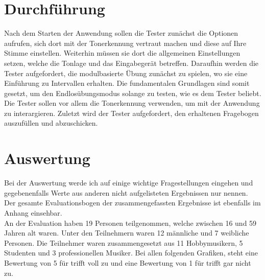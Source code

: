 \section{Durchführung}
Nach dem Starten der Anwendung sollen die Tester zunächst die Optionen aufrufen, sich dort mit der Tonerkennung vertraut machen und diese auf Ihre Stimme einstellen. Weiterhin müssen sie dort die allgemeinen Einstellungen setzen, welche die Tonlage und das Eingabegerät betreffen. Daraufhin werden die Tester aufgefordert, die modulbasierte Übung zunächst zu spielen, wo sie eine Einführung zu Intervallen erhalten. Die fundamentalen Grundlagen sind somit gesetzt, um den Endlosübungsmodus solange zu testen, wie es dem Tester beliebt. Die Tester sollen vor allem die Tonerkennung verwenden, um mit der Anwendung zu interargieren. Zuletzt wird der Tester aufgefordert, den erhaltenen Fragebogen auszufüllen und abzuschicken. 

\newpage
\section{Auswertung}
Bei der Auswertung werde ich auf einige wichtige Fragestellungen eingehen und gegebenenfalls Werte aus anderen nicht aufgelisteten Ergebnissen nur nennen. Der gesamte Evaluationsbogen der zusammengefassten Ergebnisse ist ebenfalls im Anhang einsehbar. \\
An der Evaluation haben 19 Personen teilgenommen, welche zwischen 16 und 59 Jahren alt waren. Unter den Teilnehmern waren 12 männliche und 7 weibliche Personen. Die Teilnehmer waren zusammengesetzt aus 11 Hobbymusikern, 5 Studenten und 3 professionellen Musiker. Bei allen folgenden Grafiken, steht eine Bewertung von 5 für trifft voll zu und eine Bewertung von 1 für trifft gar nicht zu.

